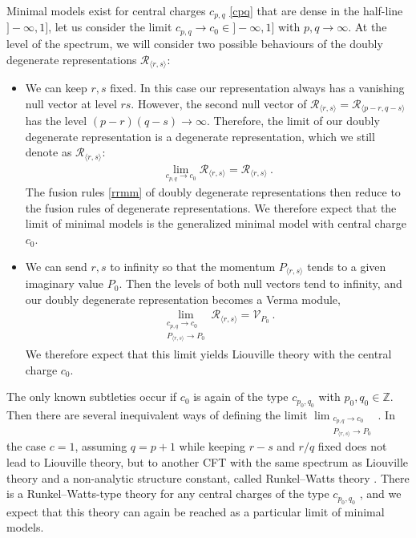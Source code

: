 \documentclass[12pt, a4paper, notitlepage, twoside]{report}
\numberwithin{equation}{section}
\theoremstyle{break}
\begin{document}
Minimal models exist for central charges $c_{p,q}$ \eqref{cpq} that are dense in the half-line $]-\infty, 1]$, let us consider the limit $c_{p, q}\to c_0\in ]-\infty, 1]$ with $p,q\to\infty$. At the level of the spectrum, we will consider two possible behaviours of the doubly degenerate representations $\mathcal{R}_{\langle r,s\rangle}$: 
\begin{itemize}
 \item We can keep $r,s$ fixed. In this case our representation always has a vanishing null vector at level $rs$. However, the second null vector of $\mathcal{R}_{\langle r,s\rangle}=\mathcal{R}_{\langle p-r,q-s\rangle}$ has the level $(p-r)(q-s)\to \infty$. Therefore, the limit of our doubly degenerate representation is a degenerate representation, which we still denote as $\mathcal{R}_{\langle r,s\rangle}$:
 \begin{align}
  \lim_{c_{p,q}\to c_0} \mathcal{R}_{\langle r,s\rangle} = \mathcal{R}_{\langle r,s\rangle} \ .
 \end{align}
The fusion rules \eqref{rrmm} of doubly degenerate representations then reduce to the fusion rules of degenerate representations. We therefore expect that the limit of minimal models is the generalized minimal model with central charge $c_0$. 
\item We can send $r,s$ to infinity so that the momentum $P_{\langle r,s\rangle}$ tends to a given imaginary value $P_0$. Then the levels of both null vectors tend to infinity, and our doubly degenerate representation becomes a Verma module,
\begin{align}
 \lim_{\substack{c_{p,q}\to c_0\\ P_{\langle r,s\rangle} \to P_0}} \mathcal{R}_{\langle r,s\rangle} = \mathcal{V}_{P_0}\ .
\end{align}
We therefore expect that this limit yields Liouville theory with the central charge $c_0$. 
\end{itemize}
The only known subtleties occur if $c_0$ is again of the type $c_{p_0,q_0}$ with $p_0,q_0\in \mathbb{Z}$. Then there are several inequivalent ways of defining the limit $\lim_{\substack{c_{p,q}\to c_0\\ P_{\langle r,s\rangle} \to P_0}}$. In the case $c=1$, assuming $q=p+1$ while keeping $r-s$ and $r/q$ fixed 
does not lead to Liouville theory, but to another CFT with the same spectrum as Liouville theory and a non-analytic structure constant, called Runkel--Watts theory \cite{rw01}. There is a Runkel--Watts-type theory for any central charges of the type $c_{p_0,q_0}$ \cite {rs15}, and we expect that this theory can again be reached as a particular limit of minimal models.
\end{document}
